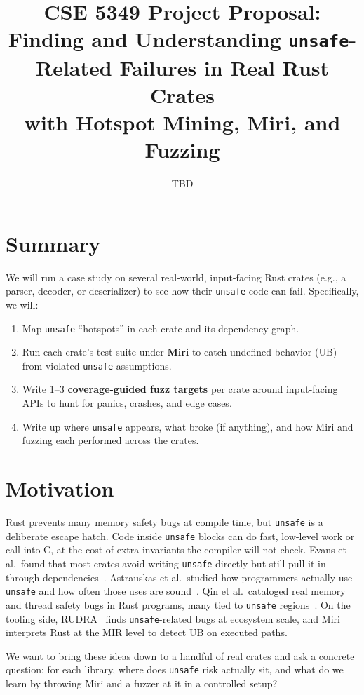 \documentclass[11pt]{article}
\title{\vspace{-0.8em}
CSE 5349 Project Proposal:\\
Finding and Understanding \texttt{unsafe}-Related Failures in Real Rust Crates\\
with Hotspot Mining, Miri, and Fuzzing
\vspace{-0.6em}}
\author{TBD}
\date{}
\begin{document}
\maketitle
\vspace{-1.0em}

\section*{Summary}
We will run a case study on several real-world, input-facing Rust crates (e.g., a parser, decoder, or deserializer) to see how their \texttt{unsafe} code can fail. Specifically, we will:
\begin{enumerate}[leftmargin=*]
  \item Map \texttt{unsafe} ``hotspots'' in each crate and its dependency graph.
  \item Run each crate's test suite under \textbf{Miri} to catch undefined behavior (UB) from violated \texttt{unsafe} assumptions.
  \item Write 1--3 \textbf{coverage-guided fuzz targets} per crate around input-facing APIs to hunt for panics, crashes, and edge cases.
  \item Write up where \texttt{unsafe} appears, what broke (if anything), and how Miri and fuzzing each performed across the crates.
\end{enumerate}

\section*{Motivation}
Rust prevents many memory safety bugs at compile time, but \texttt{unsafe} is a deliberate escape hatch. Code inside \texttt{unsafe} blocks can do fast, low-level work or call into C, at the cost of extra invariants the compiler will not check. Evans et al.\ found that most crates avoid writing \texttt{unsafe} directly but still pull it in through dependencies~\cite{EvansICSE20}. Astrauskas et al.\ studied how programmers actually use \texttt{unsafe} and how often those uses are sound~\cite{AstrauskasOOPSLA20}. Qin et al.\ cataloged real memory and thread safety bugs in Rust programs, many tied to \texttt{unsafe} regions~\cite{QinPLDI20}. On the tooling side, RUDRA~\cite{BaeSOSP21} finds \texttt{unsafe}-related bugs at ecosystem scale, and Miri~\cite{JungPOPL26} interprets Rust at the MIR level to detect UB on executed paths.

We want to bring these ideas down to a handful of real crates and ask a concrete question: for each library, where does \texttt{unsafe} risk actually sit, and what do we learn by throwing Miri and a fuzzer at it in a controlled setup?
\end{document}
